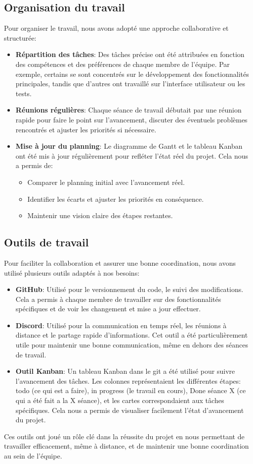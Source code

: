 \documentclass[11pt,a4paper]{article}
\begin{document}
\subsection{Organisation du travail}
Pour organiser le travail, nous avons adopté une approche collaborative et structurée:
\begin{itemize}
    \item \textbf{Répartition des tâches}: Des tâches précise ont été attribuées en fonction des compétences et des préférences de chaque membre de l'équipe. Par exemple, certains se sont concentrés sur le développement des fonctionnalités principales, tandis que d'autres ont travaillé sur l'interface utilisateur ou les tests.
    \item \textbf{Réunions régulières}: Chaque séance de travail débutait par une réunion rapide pour faire le point sur l'avancement, discuter des éventuels problèmes rencontrés et ajuster les priorités si nécessaire.
    \item \textbf{Mise à jour du planning}: Le diagramme de Gantt et le tableau Kanban ont été mis à jour régulièrement pour refléter l'état réel du projet. Cela nous a permis de:
    \begin{itemize}
        \item Comparer le planning initial avec l'avancement réel.
        \item Identifier les écarts et ajuster les priorités en conséquence.
        \item Maintenir une vision claire des étapes restantes.
    \end{itemize}
\end{itemize}

\subsection{Outils de travail}
Pour faciliter la collaboration et assurer une bonne coordination, nous avons utilisé plusieurs outils adaptés à nos besoins:
\begin{itemize}
    \item \textbf{GitHub}: Utilisé pour le versionnement du code, le suivi des modifications. Cela a permis à chaque membre de travailler sur des fonctionnalités spécifiques et de voir les changement et mise a jour effectuer.
    \item \textbf{Discord}: Utilisé pour la communication en temps réel, les réunions à distance et le partage rapide d'informations. Cet outil a été particulièrement utile pour maintenir une bonne communication, même en dehors des séances de travail.
    \item \textbf{Outil Kanban}: Un tableau Kanban dans le git a été utilisé pour suivre l'avancement des tâches. Les colonnes représentaient les différentes étapes: todo (ce qui est a faire), in progress (le travail en cours), Done séance X (ce qui a été fait a la X séance), et les cartes correspondaient aux tâches spécifiques. Cela nous a permis de visualiser facilement l'état d'avancement du projet.
\end{itemize}
Ces outils ont joué un rôle clé dans la réussite du projet en nous permettant de travailler efficacement, même à distance, et de maintenir une bonne coordination au sein de l'équipe.
\newpage
\end{document}
